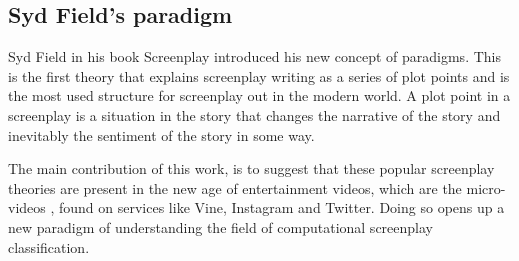 \subsection{Syd Field's paradigm}{
Syd Field in his book Screenplay introduced his new concept of paradigms. This is the first theory that explains screenplay writing as a series of plot points and is the most used structure for screenplay out in the modern world. A plot point in a screenplay is a situation in the story that changes the narrative of the story and inevitably the sentiment of the story in some way. }

\par
The main contribution of this work, is to suggest that these popular screenplay theories are present in the new age of entertainment videos, which are the micro-videos , found on services like Vine, Instagram and Twitter. Doing so opens up a new paradigm of understanding the field of computational screenplay classification.